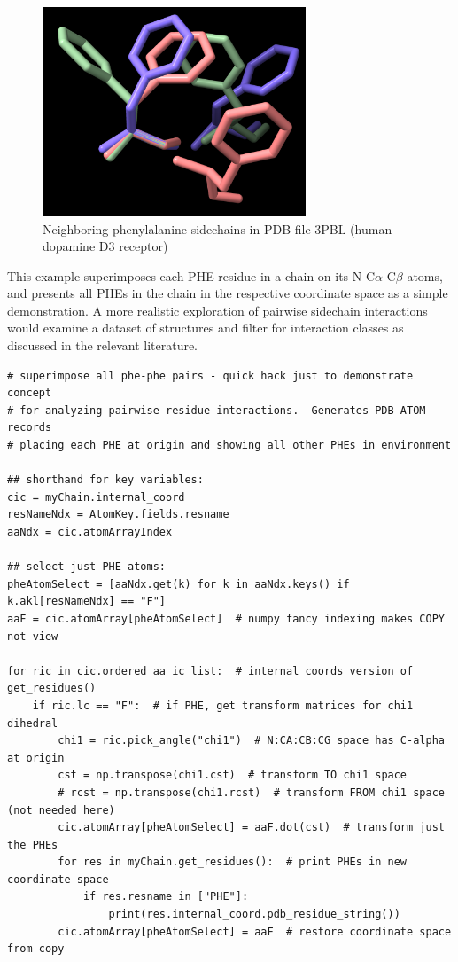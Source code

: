 \begin{figure}[htbp]
\centering
\includegraphics[width=0.7\textwidth]{images/phe-pairs-3pbl.png}
\caption{Neighboring phenylalanine sidechains in PDB file 3PBL (human dopamine D3 receptor)}
\label{fig:phepairs}
\end{figure}
	
This example superimposes each PHE residue in a chain on its N-C$\alpha$-C$\beta$ atoms,
and presents all PHEs in the chain in the respective coordinate space as a simple demonstration.
A more realistic exploration of pairwise sidechain interactions would examine a dataset of
structures and filter for interaction classes as discussed in the relevant literature.

\begin{verbatim}
# superimpose all phe-phe pairs - quick hack just to demonstrate concept
# for analyzing pairwise residue interactions.  Generates PDB ATOM records
# placing each PHE at origin and showing all other PHEs in environment

## shorthand for key variables:
cic = myChain.internal_coord
resNameNdx = AtomKey.fields.resname
aaNdx = cic.atomArrayIndex

## select just PHE atoms:
pheAtomSelect = [aaNdx.get(k) for k in aaNdx.keys() if k.akl[resNameNdx] == "F"]
aaF = cic.atomArray[pheAtomSelect]  # numpy fancy indexing makes COPY not view

for ric in cic.ordered_aa_ic_list:  # internal_coords version of get_residues()
    if ric.lc == "F":  # if PHE, get transform matrices for chi1 dihedral
        chi1 = ric.pick_angle("chi1")  # N:CA:CB:CG space has C-alpha at origin
        cst = np.transpose(chi1.cst)  # transform TO chi1 space
        # rcst = np.transpose(chi1.rcst)  # transform FROM chi1 space (not needed here)
        cic.atomArray[pheAtomSelect] = aaF.dot(cst)  # transform just the PHEs
        for res in myChain.get_residues():  # print PHEs in new coordinate space
            if res.resname in ["PHE"]:
                print(res.internal_coord.pdb_residue_string())
        cic.atomArray[pheAtomSelect] = aaF  # restore coordinate space from copy
\end{verbatim}

